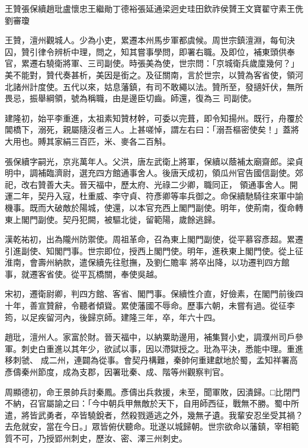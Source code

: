 
\begin{pinyinscope}

 王贊張保續趙玭盧懷忠王繼勛丁德裕張延通梁迥史珪田欽祚侯贇王文寶翟守素王侁劉審瓊



 王贊，澶州觀城人。少為小吏，累遷本州馬步軍都虞候。周世宗鎮澶淵，每旬決囚，贊引律令辨析中理，問之，知其嘗事學問，即署右職。及即位，補東頭供奉官，累遷右驍衛將軍、三司副使。時張美為使，世宗問：「京城衛兵歲廩幾何？」美不能對，贊代奏甚析，美因是銜之。及征關南，言於世宗，以贊為客省使，領河北諸州計度使。五代以來，姑息藩鎮，有司不敢繩以法。贊所至，發擿奸伏，無所畏忌，振舉綱領，號為稱職，由是邊臣切齒。師還，復為三
 司副使。



 建隆初，始平李重進，太祖素知贊材幹，可委以完葺，即令知揚州。既行，舟覆於閶橋下，溺死，親屬隨沒者三人。上甚嗟悼，謂左右曰：「溺吾樞密使矣！」蓋將大用也。賻其家絹三百匹，米、麥各二百斛。



 張保續字嗣光，京兆萬年人。父洪，唐左武衛上將軍，保續以蔭補太廟齋郎。梁貞明中，調補臨濟尉，選充四方館通事舍人。後唐天成初，領瓜州官告國信副使。郊祀，改右贊善大夫。晉天福中，歷太府、光祿二少卿，職同正，
 領通事舍人。開運二年，契丹入寇，杜重威、李守貞、符彥卿等率兵御之。命保續馳騎往來軍中諭機事。既而大破敵於陽城，使還，以本官充西上閣門副使。明年，使荊南，復命轉東上閣門副使。契丹犯闕，被驅北徙，留範陽，歲餘逃歸。



 漢乾祐初，出為隴州防禦使。周祖革命，召為東上閣門副使，從平慕容彥超。累遷引進副使、知閣門事。世宗即位，授西上閣門使。明年，進秩東上閣門使。從上征淮南，會壽州納款，遣保續先往慰撫，及劉仁贍率
 將卒出降，以功遷判四方館事，就遷客省使。從平瓦橋關，奉使吳越。



 宋初，遷衛尉卿，判四方館、客省、閣門事。保續性介直，好儉素，在閣門前後四十年，善宣贊辭，令聽者傾聳。累使藩國不辱命。歷事六朝，未嘗有過。從征李筠，以足疾留河內，後歸京師。建隆三年，卒，年六十四。



 趙玭，澶州人。家富於財。晉天福中，以納粟助邊用，補集賢小史，調濮州司戶參軍。刺史白重進以其年少，欲試以事，因以滯獄授之。玭為平決，悉能中理。重進移刺虢、
 成二州，連闢為從事。會契丹構難，秦帥何重建獻地於蜀，孟知祥署高彥儔秦州節度，成為支郡，因署玭秦、成、階等州觀察判官。



 周顯德初，命王景帥兵討秦鳳。彥儔出兵救援，未至，聞軍敗，因潰歸。□比閉門不納，召官屬諭之曰：「今中朝兵甲無敵於天下，自用師西征，戰無不勝。蜀中所遣，將皆武勇者，卒皆驍銳者，然殺戮遁逃之外，幾無孑遺。我輩安忍坐受其禍？去危就安，當在今日。」眾皆俯伏聽命。玭遂以城歸朝。世宗欲命以藩鎮，宰相範
 質不可，乃授郢州刺史，歷汝、密、澤三州刺史。




\end{pinyinscope}
